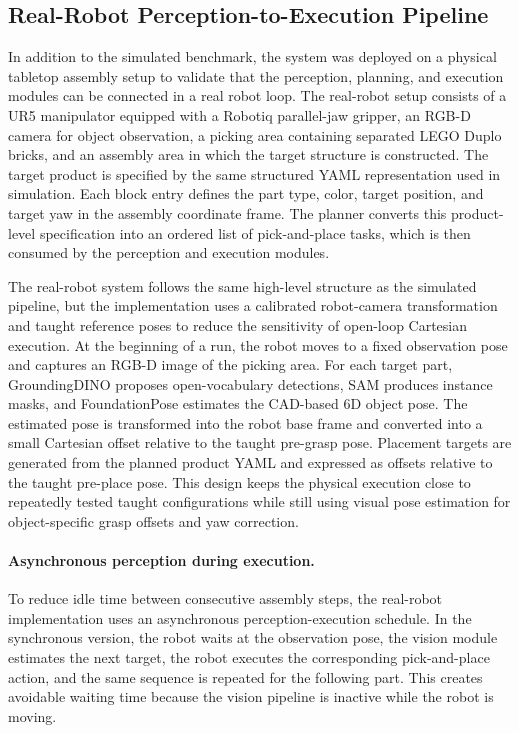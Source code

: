 
\subsection{Real-Robot Perception-to-Execution Pipeline}
\label{subsec:real_robot_pipeline}

In addition to the simulated benchmark, the system was deployed on a physical tabletop
assembly setup to validate that the perception, planning, and execution modules can be
connected in a real robot loop. The real-robot setup consists of a UR5 manipulator equipped
with a Robotiq parallel-jaw gripper, an RGB-D camera for object observation, a picking area
containing separated LEGO Duplo bricks, and an assembly area in which the target structure is
constructed. The target product is specified by the same structured YAML representation used
in simulation. Each block entry defines the part type, color, target position, and target yaw in
the assembly coordinate frame. The planner converts this product-level specification into an
ordered list of pick-and-place tasks, which is then consumed by the perception and execution
modules.

The real-robot system follows the same high-level structure as the simulated pipeline, but the
implementation uses a calibrated robot-camera transformation and taught reference poses to
reduce the sensitivity of open-loop Cartesian execution. At the beginning of a run, the robot
moves to a fixed observation pose and captures an RGB-D image of the picking area. For each
target part, GroundingDINO proposes open-vocabulary detections, SAM produces instance
masks, and FoundationPose estimates the CAD-based 6D object pose. The estimated pose is
transformed into the robot base frame and converted into a small Cartesian offset relative to
the taught pre-grasp pose. Placement targets are generated from the planned product YAML
and expressed as offsets relative to the taught pre-place pose. This design keeps the physical
execution close to repeatedly tested taught configurations while still using visual pose
estimation for object-specific grasp offsets and yaw correction.

\paragraph{Asynchronous perception during execution.}
To reduce idle time between consecutive assembly steps, the real-robot implementation uses
an asynchronous perception-execution schedule. In the synchronous version, the robot waits at
the observation pose, the vision module estimates the next target, the robot executes the
corresponding pick-and-place action, and the same sequence is repeated for the following
part. This creates avoidable waiting time because the vision pipeline is inactive while the
robot is moving.

